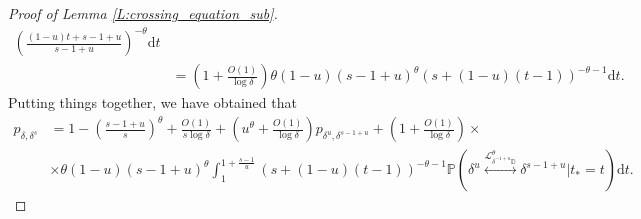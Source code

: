 \documentclass[10pt,a4paper]{amsart}
\newcommand{\D}{\mathbb{D}}
\newcommand{\Lc}{\mathcal{L}}
\newcommand{\Prob}[1]{\mathbb{P} \left( #1 \right) }
\renewcommand{\d}{\mathrm{d}}
\begin{document}
\begin{proof}[Proof of Lemma \ref{L:crossing_equation_sub}]
\begin{align*}
\left( \frac{(1-u)t + s-1+u}{s-1+u} \right)^{-\theta} \d t \\
& = \left( 1 + \frac{O(1)}{\log \delta} \right) \theta (1-u) (s-1+u)^\theta (s + (1-u)(t-1))^{-\theta-1} \d t.
\end{align*}
Putting things together, we have obtained that
\begin{align*}
p_{\delta,\delta^s}
& = 1 - \left( \frac{s-1+u}{s} \right)^\theta + \frac{O(1)}{s \log \delta}
+ \left( u^\theta + \frac{O(1)}{\log \delta} \right) p_{\delta^u, \delta^{s-1+u}} + \left( 1 + \frac{O(1)}{\log \delta} \right) \times \\
& \times \theta (1-u) (s-1+u)^\theta
\int_1^{1 + \frac{s-1}{u}} (s + (1-u)(t-1))^{-\theta-1} \Prob{ \delta^u \overset{\Lc_{\delta^{-1+u} \D}^\theta}{\longleftrightarrow} \delta^{s-1+u} \Big\vert t_* = t} \d t.
\end{align*}


\end{proof}
\end{document}
